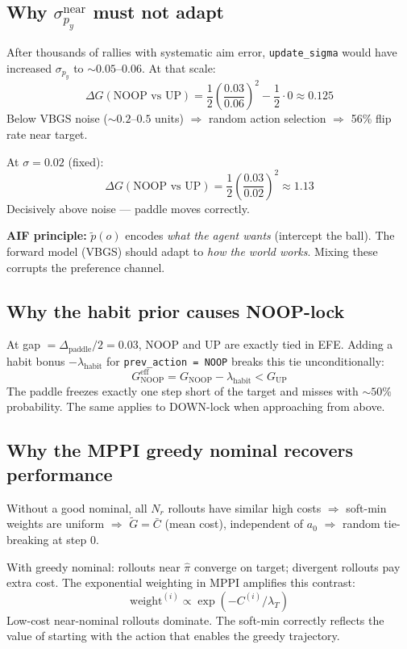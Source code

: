 \documentclass[12pt, a4paper]{article}
\newcommand{\1}{\mathbf{1}}
\newcommand{\code}[1]{\texttt{#1}}
\begin{document}
\subsection{Why $\sigma_{p_y}^\text{near}$ must not adapt}

After thousands of rallies with systematic aim error, \code{update\_sigma} would
have increased $\sigma_{p_y}$ to $\sim 0.05$--$0.06$.  At that scale:
\[
\Delta G(\text{NOOP vs UP})
= \frac{1}{2}\left(\frac{0.03}{0.06}\right)^2 - \frac{1}{2}\cdot 0
\approx 0.125
\]
Below VBGS noise ($\sim 0.2$--$0.5$ units) $\Rightarrow$ random action selection
$\Rightarrow$ 56\% flip rate near target.

At $\sigma = 0.02$ (fixed):
\[
\Delta G(\text{NOOP vs UP})
= \frac{1}{2}\left(\frac{0.03}{0.02}\right)^2 \approx 1.13
\]
Decisively above noise --- paddle moves correctly.

\textbf{AIF principle:} $\tilde{p}(o)$ encodes \textit{what the agent wants}
(intercept the ball).  The forward model (VBGS) should adapt to
\textit{how the world works}.  Mixing these corrupts the preference channel.

\subsection{Why the habit prior causes NOOP-lock}

At gap $= \Delta_\text{paddle}/2 = 0.03$, NOOP and UP are exactly tied in EFE.
Adding a habit bonus $-\lambda_\text{habit}$ for \code{prev\_action = NOOP}
breaks this tie unconditionally:
\[
G_\text{NOOP}^\text{eff} = G_\text{NOOP} - \lambda_\text{habit} < G_\text{UP}
\]
The paddle freezes exactly one step short of the target and misses with $\sim 50\%$
probability.  The same applies to DOWN-lock when approaching from above.

\subsection{Why the MPPI greedy nominal recovers performance}

Without a good nominal, all $N_r$ rollouts have similar high costs
$\Rightarrow$ soft-min weights are uniform
$\Rightarrow$ $\tilde G = \bar C$ (mean cost), independent of $a_0$
$\Rightarrow$ random tie-breaking at step 0.

With greedy nominal: rollouts near $\hat\pi$ converge on target; divergent
rollouts pay extra cost.  The exponential weighting in MPPI amplifies this
contrast:
\[
\text{weight}^{(i)} \propto \exp\!\left(-C^{(i)}/\lambda_T\right)
\]
Low-cost near-nominal rollouts dominate.  The soft-min correctly reflects the
value of starting with the action that enables the greedy trajectory.
\end{document}
